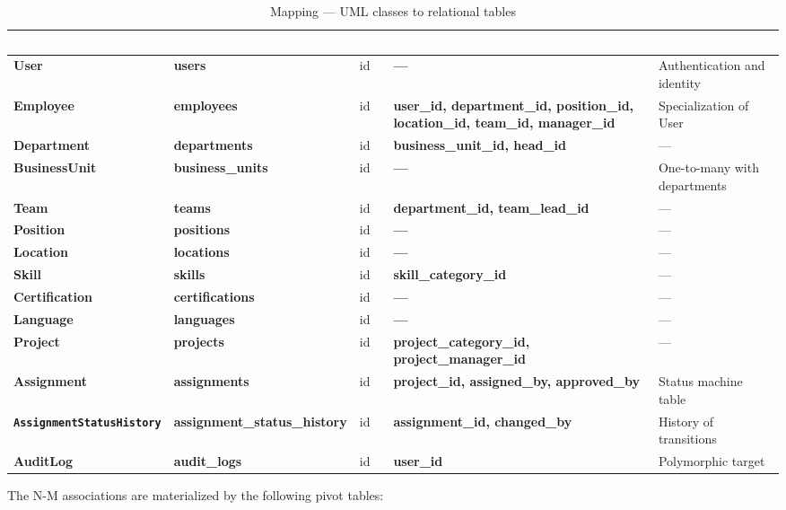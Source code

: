 \documentclass{bts-report}
\begin{document}
\begin{table}[H]
  \centering
  \caption{Mapping --- UML classes to relational tables}
  \label{tab:relational-mapping}
  \begin{tabularx}{\textwidth}{|>{\bfseries}p{3.2cm}|>{\bfseries}p{3.0cm}|p{1.6cm}|>{\bfseries}p{2.8cm}|X|}
    \hline
    \rowcolor{tableheader}
    \textcolor{white}{\textbf{UML Class}} & \textcolor{white}{\textbf{SQL Table}} & \multicolumn{1}{c|}{\textcolor{white}{\textbf{PK}}} & \multicolumn{1}{c|}{\textcolor{white}{\textbf{FK}}} & \textcolor{white}{\textbf{Remarks}} \\
    \hline
    User & users & id & --- & Authentication and identity \\
    \hline
    Employee & employees & id & user\_id, department\_id, position\_id, location\_id, team\_id, manager\_id & Specialization of User \\
    \hline
    Department & departments & id & business\_unit\_id, head\_id & --- \\
    \hline
    BusinessUnit & business\_units & id & --- & One-to-many with departments \\
    \hline
    Team & teams & id & department\_id, team\_lead\_id & --- \\
    \hline
    Position & positions & id & --- & --- \\
    \hline
    Location & locations & id & --- & --- \\
    \hline
    Skill & skills & id & skill\_category\_id & --- \\
    \hline
    Certification & certifications & id & --- & --- \\
    \hline
    Language & languages & id & --- & --- \\
    \hline
    Project & projects & id & project\_category\_id, project\_manager\_id & --- \\
    \hline
    Assignment & assignments & id & project\_id, assigned\_by, approved\_by & Status machine table \\
    \hline
    \texttt{AssignmentStatusHistory} & assignment\_status\_history & id & assignment\_id, changed\_by & History of transitions \\
    \hline
    AuditLog & audit\_logs & id & user\_id & Polymorphic target \\
    \hline
  \end{tabularx}
\end{table}

The N-M associations are materialized by the following pivot tables:
\end{document}

